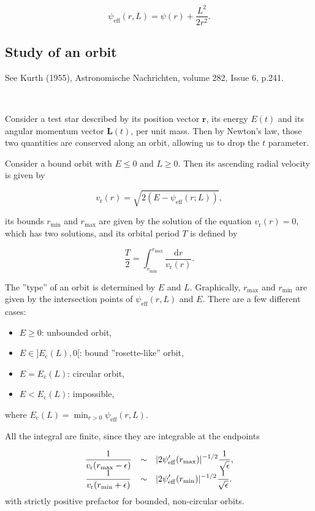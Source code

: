 \documentclass[11pt]{article}
\newcommand{\rr}{\mathrm{r}}
\newcommand{\rc}{\mathrm{c}}
\newcommand{\rd}{{\mathrm{d}}}
\newcommand{\psieff}{\psi_{\mathrm{eff}}}
\newcommand{\vr}{v_{\rr}}
\newcommand{\Ec}{E_{\rc}}
\newcommand{\rmax}{r_{\max}}
\newcommand{\rmin}{r_{\min}}
\newcommand{\bL}{\boldsymbol{L}}
\newcommand{\br}{\boldsymbol{r}}
\begin{document}
\begin{equation}
  \psieff(r,L) = \psi(r) + \frac{L^{2}}{2r^{2}} .
  \label{eq:Effective_potential}
  \end{equation}

\subsection{Study of an orbit}
\label{subsec:OrbitGlobular}

See Kurth (1955), Astronomische Nachrichten, volume 282, Issue
6, p.241.

~

Consider a test star described by its position vector $\br$,
its energy  $E(t)$ and its angular
momentum vector $\bL(t)$, per unit mass. Then by Newton's law, those two quantities are conserved along an orbit, allowing us to drop the $t$ parameter.

Consider a bound orbit with $E\leq 0$ and $L \geq 0$. Then its ascending radial velocity is given by

\begin{equation}
  \vr(r) = \sqrt{2(E-\psieff(r;L))} ,
  \label{eq:radial_velocity}
\end{equation}

its bounds $\rmin$ and $\rmax$ are given by the solution of the equation $\vr(r)=0$, which has two solutions, and its orbital period $T$ is defined by

\begin{equation}
 \frac{T}{2}=\int_{\rmin}^{\rmax}\frac{{\rd}r}{\vr(r)} .
  \label{eq:orbital_period}
  \end{equation}

The ''type'' of an orbit is determined by $E$ and $L$. Graphically, $\rmax$ and $\rmin$ are given by the intersection points of $\psieff(r,L)$ and $E$. There are a few different cases:
\begin{itemize}
\item $E \geq 0$: unbounded orbit,
\item $E \in ]\Ec(L),0[$: bound ''rosette-like'' orbit,
\item $E = \Ec(L)$: circular orbit,
\item $E < \Ec(L)$: impossible,
\end{itemize}
where $\Ec(L) = \min_{r>0}\psieff(r,L)$.

All the integral are finite, since they are integrable at the endpoints

\begin{equation}
\begin{array}{ccl}
 \displaystyle{\frac{1}{\vr(\rmax-\epsilon)}} & \sim& \displaystyle{|2\psi_{{\rm eff}}'(r_{\max})|^{-1/2}\frac{1}{\sqrt{\epsilon}}} ,\\
  
 \displaystyle{\frac{1}{\vr(\rmin+\epsilon)}} & \sim&\displaystyle{|2\psi_{{\rm eff}}'(r_{\min})|^{-1/2}\frac{1}{\sqrt{\epsilon}}} .
\end{array}
\label{eq:integrable_T}
\end{equation}
with strictly positive prefactor for bounded, non-circular orbits.
\end{document}
